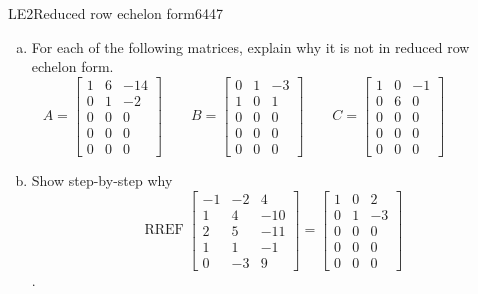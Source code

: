 \begin{exercise}{LE2}{Reduced row echelon form}{6447} 
\begin{exerciseStatement} 

\begin{enumerate}[(a)]
\item  

 For each of the following matrices, explain why it is not in reduced row echelon form. \[
                            A = \left[\begin{array}{ccc}
1 & 6 & -14 \\
0 & 1 & -2 \\
0 & 0 & 0 \\
0 & 0 & 0 \\
0 & 0 & 0
\end{array}\right] \hspace{2em}
                            B = \left[\begin{array}{ccc}
0 & 1 & -3 \\
1 & 0 & 1 \\
0 & 0 & 0 \\
0 & 0 & 0 \\
0 & 0 & 0
\end{array}\right] \hspace{2em}
                            C = \left[\begin{array}{ccc}
1 & 0 & -1 \\
0 & 6 & 0 \\
0 & 0 & 0 \\
0 & 0 & 0 \\
0 & 0 & 0
\end{array}\right] \hspace{2em}
                        \hspace{2em}
                    \] 

 
\item  

 Show step-by-step why \[\operatorname{RREF}\left[\begin{array}{ccc}
-1 & -2 & 4 \\
1 & 4 & -10 \\
2 & 5 & -11 \\
1 & 1 & -1 \\
0 & -3 & 9
\end{array}\right]=\left[\begin{array}{ccc}
1 & 0 & 2 \\
0 & 1 & -3 \\
0 & 0 & 0 \\
0 & 0 & 0 \\
0 & 0 & 0
\end{array}\right]\]. 


\end{enumerate}
\end{exerciseStatement}
\end{exercise}
